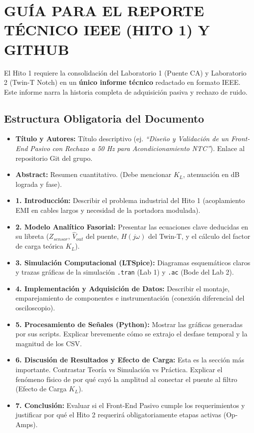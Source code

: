 \documentclass[11pt,a4paper,twoside]{article}
\begin{document}
\newpage
\section{GUÍA PARA EL REPORTE TÉCNICO IEEE (HITO 1) Y GITHUB}
El Hito 1 requiere la consolidación del Laboratorio 1 (Puente CA) y Laboratorio 2 (Twin-T Notch) en un \textbf{único informe técnico} redactado en formato IEEE. Este informe narra la historia completa de adquisición pasiva y rechazo de ruido.

\subsection*{Estructura Obligatoria del Documento}
\begin{itemize}
    \item \textbf{Título y Autores:} Título descriptivo (ej. \textit{``Diseño y Validación de un Front-End Pasivo con Rechazo a 50 Hz para Acondicionamiento NTC''}). Enlace al repositorio Git del grupo.
    \item \textbf{Abstract:} Resumen cuantitativo. (Debe mencionar $K_L$, atenuación en dB lograda y fase).
    \item \textbf{1. Introducción:} Describir el problema industrial del Hito 1 (acoplamiento EMI en cables largos y necesidad de la portadora modulada).
    \item \textbf{2. Modelo Analítico Fasorial:} Presentar las ecuaciones clave deducidas en su libreta ($Z_{sensor}$, $\hat{V}_{out}$ del puente, $H(j\omega)$ del Twin-T, y el cálculo del factor de carga teórica $K_L$).
    \item \textbf{3. Simulación Computacional (LTSpice):} Diagramas esquemáticos claros y trazas gráficas de la simulación \texttt{.tran} (Lab 1) y \texttt{.ac} (Bode del Lab 2).
    \item \textbf{4. Implementación y Adquisición de Datos:} Describir el montaje, emparejamiento de componentes e instrumentación (conexión diferencial del osciloscopio).
    \item \textbf{5. Procesamiento de Señales (Python):} Mostrar las gráficas generadas por sus scripts. Explicar brevemente cómo se extrajo el desfase temporal y la magnitud de los CSV.
    \item \textbf{6. Discusión de Resultados y Efecto de Carga:} Esta es la sección más importante. Contrastar Teoría vs Simulación vs Práctica. Explicar el fenómeno físico de por qué cayó la amplitud al conectar el puente al filtro (Efecto de Carga $K_L$).
    \item \textbf{7. Conclusión:} Evaluar si el Front-End Pasivo cumple los requerimientos y justificar por qué el Hito 2 requerirá obligatoriamente etapas activas (Op-Amps).
\end{itemize}
\end{document}
